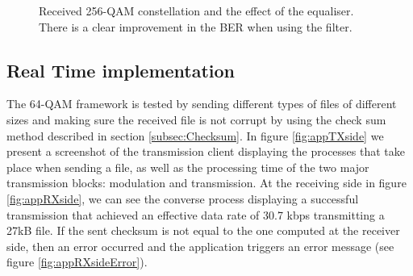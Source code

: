 \documentclass[12pt,a4paper,openright]{report}
\begin{document}
\begin{figure}[H]
\begin{subfigure}[t]{.45\textwidth}
     \label{fig:64qam_constellation}
    \end{subfigure}
 \caption[Received 256-QAM constellation and the effect of the equaliser]{Received 256-QAM constellation and the effect of the equaliser. There is a clear improvement in the BER when using the filter.}
    \label{fig:RcvdQAMsignal}
 \end{figure} 

\subsection{Real Time implementation}

The 64-QAM framework is tested by sending different types of files of different sizes and making sure the received file is not corrupt by using the check sum method described in section \ref{subsec:Checksum}.  In figure \ref{fig:appTXside} we present a screenshot of the transmission client displaying the processes that take place when sending a file, as well as the processing time of the two major transmission blocks: modulation and transmission. At the receiving side in figure \ref{fig:appRXside}, we can see the converse process displaying a successful transmission that achieved an effective data rate of 30.7 kbps transmitting a 27kB file. If the sent checksum is not equal to the one computed at the receiver side, then an error occurred and the application triggers an error message (see figure \ref{fig:appRXsideError}).
\end{document}
